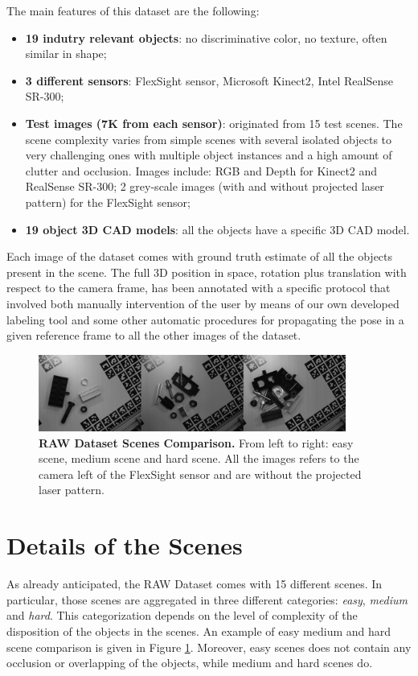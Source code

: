 The main features of this dataset are the following:
\begin{itemize}
	\item \textbf{19 indutry relevant objects}: no discriminative color, no texture, often similar in shape;
	\item \textbf{3 different sensors}: FlexSight sensor, Microsoft Kinect2, Intel RealSense SR-300;
	\item \textbf{Test images (7K from each sensor)}: originated from 15 test scenes. The scene complexity varies from simple scenes with several isolated objects to very challenging ones with multiple object instances and a high amount of clutter and occlusion. Images include: RGB and Depth for Kinect2 and RealSense SR-300; 2 grey-scale images (with and without projected laser pattern) for the FlexSight sensor;
	\item \textbf{19 object 3D CAD models}: all the objects have a specific 3D CAD model.
\end{itemize}

Each image of the dataset comes with ground truth estimate of all the objects present in the scene. The full 3D position in space, rotation plus translation with respect to the camera frame, has been annotated with a specific protocol that involved both manually intervention of the user by means of our own developed labeling tool and some other automatic procedures for propagating the pose in a given reference frame to all the other images of the dataset.

\begin{figure}
    \centering
    \includegraphics[width=0.9\textwidth]{figures/3_raw_dataset/easy_medium_hard_scene}
    \caption{\textbf{RAW Dataset Scenes Comparison.} From left to right: easy scene, medium scene and hard scene. All the images refers to the camera left of the FlexSight sensor and are without the projected laser pattern.}
    \label{fig:easy_medium_hard_scene}
\end{figure}

\section{Details of the Scenes}\label{sec:raw_scenes_details}
As already anticipated, the RAW Dataset comes with 15 different scenes. In particular, those scenes are aggregated in three different categories: \emph{easy}, \emph{medium} and \emph{hard}. This categorization depends on the level of complexity of the disposition of the objects in the scenes. An example of easy medium and hard scene comparison is given in Figure \ref{fig:easy_medium_hard_scene}. Moreover, easy scenes does not contain any occlusion or overlapping of the objects, while medium and hard scenes do.

